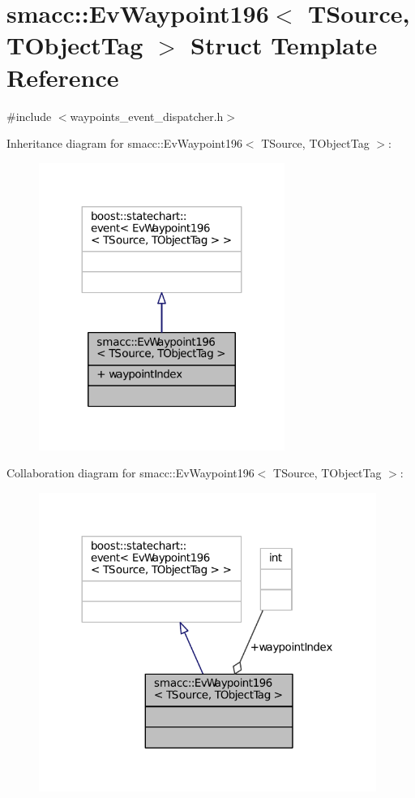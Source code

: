 \hypertarget{structsmacc_1_1EvWaypoint196}{}\section{smacc\+:\+:Ev\+Waypoint196$<$ T\+Source, T\+Object\+Tag $>$ Struct Template Reference}
\label{structsmacc_1_1EvWaypoint196}


{\ttfamily \#include $<$waypoints\+\_\+event\+\_\+dispatcher.\+h$>$}



Inheritance diagram for smacc\+:\+:Ev\+Waypoint196$<$ T\+Source, T\+Object\+Tag $>$\+:
\nopagebreak
\begin{figure}[H]
\begin{center}
\leavevmode
\includegraphics[width=227pt]{structsmacc_1_1EvWaypoint196__inherit__graph}
\end{center}
\end{figure}


Collaboration diagram for smacc\+:\+:Ev\+Waypoint196$<$ T\+Source, T\+Object\+Tag $>$\+:
\nopagebreak
\begin{figure}[H]
\begin{center}
\leavevmode
\includegraphics[width=312pt]{structsmacc_1_1EvWaypoint196__coll__graph}
\end{center}
\end{figure}
